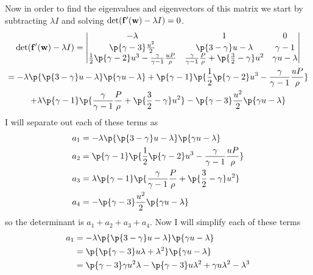 \documentclass[11pt, oneside]{article}
\begin{document}
\begin{enumerate}
    Now in order to find the eigenvalues and eigenvectors of this matrix we
    start by subtracting $\lambda I$ and solving
    $\det(\mathbf{f}'(\mathbf{w}) - \lambda I) = 0$.
    \begin{gather*}
      \det(\v{f}'(\v{w}) - \lambda I) =
      \begin{vmatrix}
        -\lambda & 1 & 0 \\
        \p{\gamma - 3} \frac{u^2}{2} & \p{3 - \gamma}u - \lambda & \gamma - 1 \\
        \frac{1}{2}\p{\gamma - 2} u^3 - \frac{\gamma}{\gamma - 1}\frac{uP}{\rho} & \frac{\gamma}{\gamma - 1}\frac{P}{\rho} + \p{\frac{3}{2} - \gamma}u^2  & \gamma u - \lambda \\
      \end{vmatrix} \\
      = -\lambda \p{\p{3 - \gamma}u - \lambda} \p{\gamma u - \lambda} + \p{\gamma - 1}\p{\frac{1}{2}\p{\gamma - 2} u^3 - \frac{\gamma}{\gamma - 1}\frac{uP}{\rho}} \\
      + \lambda \p{\gamma - 1} \p{\frac{\gamma}{\gamma - 1}\frac{P}{\rho} + \p{\frac{3}{2} - \gamma}u^2} - \p{\gamma - 3} \frac{u^2}{2}\p{\gamma u - \lambda}
    \end{gather*}
    I will separate out each of these terms as
    \begin{align*}
      a_1 &= -\lambda \p{\p{3 - \gamma}u - \lambda} \p{\gamma u - \lambda} \\
      a_2 &= \p{\gamma - 1}\p{\frac{1}{2}\p{\gamma - 2} u^3 - \frac{\gamma}{\gamma - 1}\frac{uP}{\rho}} \\
      a_3 &= \lambda \p{\gamma - 1} \p{\frac{\gamma}{\gamma - 1}\frac{P}{\rho} + \p{\frac{3}{2} - \gamma}u^2} \\
      a_4 &= -\p{\gamma - 3} \frac{u^2}{2}\p{\gamma u - \lambda}
    \end{align*}
    so the determinant is $a_1 + a_2 + a_3 + a_4$.
    Now I will simplify each of these terms
    \begin{align*}
      a_1 &=  -\lambda \p{\p{3 - \gamma}u - \lambda} \p{\gamma u - \lambda} \\
      &= \p{\p{\gamma - 3}u\lambda + \lambda^2} \p{\gamma u - \lambda} \\
      &= \p{\gamma - 3}\gamma u^2 \lambda - \p{\gamma - 3} u\lambda^2 + \gamma u \lambda^2 - \lambda^3 \\

\end{align*}
\end{enumerate}
\end{document}
